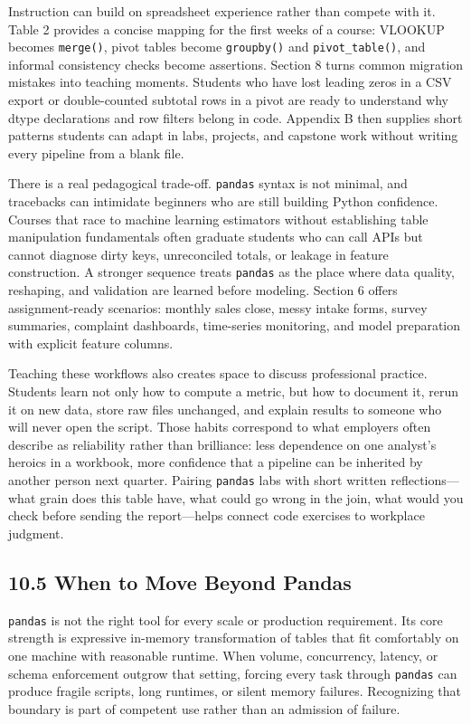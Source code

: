 \documentclass[
  12pt,
]{article}
\begin{document}
Instruction can build on spreadsheet experience rather than compete with
it. Table 2 provides a concise mapping for the first weeks of a course:
VLOOKUP becomes \texttt{merge()}, pivot tables become \texttt{groupby()}
and \texttt{pivot\_table()}, and informal consistency checks become
assertions. Section 8 turns common migration mistakes into teaching
moments. Students who have lost leading zeros in a CSV export or
double-counted subtotal rows in a pivot are ready to understand why
dtype declarations and row filters belong in code. Appendix B then
supplies short patterns students can adapt in labs, projects, and
capstone work without writing every pipeline from a blank file.

There is a real pedagogical trade-off. \texttt{pandas} syntax is not
minimal, and tracebacks can intimidate beginners who are still building
Python confidence. Courses that race to machine learning estimators
without establishing table manipulation fundamentals often graduate
students who can call APIs but cannot diagnose dirty keys, unreconciled
totals, or leakage in feature construction. A stronger sequence treats
\texttt{pandas} as the place where data quality, reshaping, and
validation are learned before modeling. Section 6 offers
assignment-ready scenarios: monthly sales close, messy intake forms,
survey summaries, complaint dashboards, time-series monitoring, and
model preparation with explicit feature columns.

Teaching these workflows also creates space to discuss professional
practice. Students learn not only how to compute a metric, but how to
document it, rerun it on new data, store raw files unchanged, and
explain results to someone who will never open the script. Those habits
correspond to what employers often describe as reliability rather than
brilliance: less dependence on one analyst's heroics in a workbook, more
confidence that a pipeline can be inherited by another person next
quarter. Pairing \texttt{pandas} labs with short written
reflections---what grain does this table have, what could go wrong in
the join, what would you check before sending the report---helps connect
code exercises to workplace judgment.

\subsection{10.5 When to Move Beyond
Pandas}\label{when-to-move-beyond-pandas}

\texttt{pandas} is not the right tool for every scale or production
requirement. Its core strength is expressive in-memory transformation of
tables that fit comfortably on one machine with reasonable runtime. When
volume, concurrency, latency, or schema enforcement outgrow that
setting, forcing every task through \texttt{pandas} can produce fragile
scripts, long runtimes, or silent memory failures. Recognizing that
boundary is part of competent use rather than an admission of failure.
\end{document}
